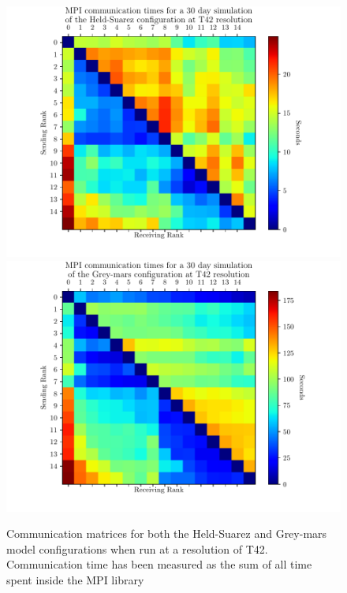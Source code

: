 \documentclass[a4paper,11pt]{report}
\begin{document}
\begin{figure}[htbp]
\begin{center}
\includegraphics[width=\textwidth]{img/comm_mat_Held-Suarez.pdf}
\includegraphics[width=\textwidth]{img/comm_mat_grey-mars.pdf}
\caption[Communication matrices for Held-Suarez and Grey-Mars]{Communication matrices for both the Held-Suarez and Grey-mars model configurations when run at a resolution of T42. Communication time has been measured as the sum of all time spent inside the MPI library}
\label{fig:comm_mat}
\end{center}
\end{figure}
\end{document}
